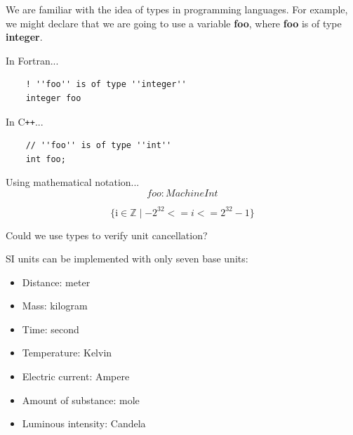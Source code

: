 \documentclass{beamer}
\begin{document}
\begin{frame}[fragile]
  We are familiar with the idea of types in programming languages. 
  For example, we might declare that we are going to use a variable \textbf{foo}, where
  \textbf{foo} is of type \textbf{integer}.
  \vspace{4mm}

  In Fortran...
  \begin{verbatim}
    ! ''foo'' is of type ''integer''
    integer foo
  \end{verbatim}

  In C{}\verb!++!...
   \begin{verbatim}
    // ''foo'' is of type ''int''
    int foo;
   \end{verbatim}

   \pause
   Using mathematical notation...
   \begin{equation*}
     foo : MachineInt
   \end{equation*}

  \vspace{4mm}
  \pause
  \begin{equation*}
    \{ \text{i} \in \mathbb{Z} \mid -2^{32} <= i <= 2^{32} - 1 \}
  \end{equation*}
\end{frame}


\begin{frame}[fragile]
  Could we use types to verify unit cancellation?

  \pause
  \vspace{4mm}
  SI units can be implemented with only seven base units: \pause
  \begin{itemize}
  \item{Distance: meter}
  \item{Mass: kilogram}
  \item{Time: second}
  \item{Temperature: Kelvin}
  \item{Electric current: Ampere}
  \item{Amount of substance: mole}
  \item{Luminous intensity: Candela}
  \end{itemize}
\end{frame}
\end{document}
